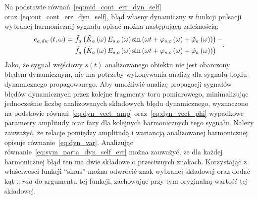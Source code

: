 Na podstawie równań~\eqref{eq:mid_cont_err_dyn_self} oraz~\eqref{eq:out_cont_err_dyn_self}, błąd własny dynamiczny w funkcji pulsacji wybranej harmonicznej sygnału opisać można następującą zależnością:
\begin{equation}
\begin{split}
e_{a,dw} \left(t,\omega\right) =~
& \tilde{f}_{a} \left(\tilde{K}_{a} \left(\omega\right) E_{s,o} \left(\omega\right) \sin \left( \omega t + \varphi_{s,o} \left(\omega\right) + \tilde{\varphi}_{a} \left(\omega\right) \right)\right) - \\
& \tilde{f}_{a} \left(\dot{K}_{a} \left(\omega\right) E_{s,o} \left(\omega\right) \sin \left( \omega t + \varphi_{s,o} \left(\omega\right) + \dot{\varphi}_{a} \left(\omega\right) \right)\right)
\end{split}
\label{eq:sym_parta_dyn_self_err}.
\end{equation}
Jako, że sygnał wejściowy $s(t)$ analizowanego obiektu nie jest obarczony błędem dynamicznym, nie ma potrzeby wykonywania analizy dla sygnału błędu dynamicznego propagowanego. Aby umożliwić analizę propagacji sygnałów błędów dynamicznych przez kolejne fragmenty toru pomiarowego, minimalizując jednocześnie liczbę analizowanych składowych błędu dynamicznego, wyznaczono na podstawie równań~\eqref{eq:dyn_vect_amp} oraz~\eqref{eq:dyn_vect_phi} wypadkowe parametry amplitudy oraz fazy dla kolejnych harmonicznych tego sygnału. Należy zauważyć, że relacje pomiędzy amplitudą i wariancją analizowanej harmonicznej opisuje równanie~\eqref{eq:dyn_var}. Analizując równanie~\eqref{eq:sym_parta_dyn_self_err} można zauważyć, że dla każdej harmonicznej błąd ten ma dwie składowe o przeciwnych znakach. Korzystając z właściwości funkcji \enquote{sinus} można odwrócić znak wybranej składowej oraz dodać kąt $\pi~\unit{rad}$ do argumentu tej funkcji, zachowując przy tym oryginalną wartość tej składowej.

